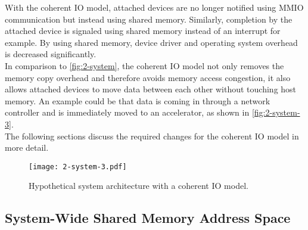 With the coherent IO model, attached devices are no longer notified using MMIO communication but instead using shared memory. Similarly, completion by the attached device is signaled using shared memory instead of an interrupt for example. By using shared memory, device driver and operating system overhead is decreased significantly.\\
In comparison to \autoref{fig:2-system}, the coherent IO model not only removes the memory copy overhead and therefore avoids memory access congestion, it also allows attached devices to move data between each other without touching host memory. An example could be that data is coming in through a network controller and is immediately moved to an accelerator, as shown in \autoref{fig:2-system-3}.\\
The following sections discuss the required changes for the coherent IO model in more detail.

\begin{figure}[h]
  \centering
  \texttt{[image: 2-system-3.pdf]}
  \caption{Hypothetical system architecture with a coherent IO model.}
  \label{fig:2-system-3}
\end{figure}



\subsection{System-Wide Shared Memory Address Space}





